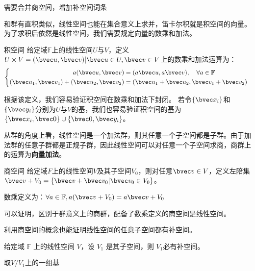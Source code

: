 

\begin{issues}
\issueDraft 
需要合并商空间，增加补空间词条
\end{issues}
和群有直积类似，线性空间也能在集合意义上求并，笛卡尔积就是积空间的向量。为了求积后依然是线性空间，我们需要规定向量的数乘和加法。

\begin{definition}{积空间}
给定域$\mathbb F $上的线性空间$U$与$V$，定义$U\times V={(\bvec u,\bvec v)|\bvec u\in U,\bvec v\in V}$上的数乘和加法运算为：
\begin{equation}
\left\{\begin{aligned}
a(\bvec u,\bvec v)&=(a\bvec u,a\bvec v),\quad \forall a\in \mathbb F\\
(\bvec u_1,\bvec v_1)+(\bvec u_2,\bvec v_2)&=(\bvec u_1+\bvec u_2,\bvec v_1+\bvec v_2)
\end{aligned}\right.~
\end{equation}
\end{definition}
根据该定义，我们容易验证积空间在数乘和加法下封闭。
若令$\{\bvec x_i\}$和$\{\bvec y_i\}$分别为$U$与$V$的基，我们也容易验证积空间的基为$\{\bvec x_i,\bvec 0\}\cup \{\bvec 0,\bvec y_i\}$。

从群的角度上看，线性空间是一个加法群，则其任意一个子空间都是子群。由于加法群的任意子群都是正规子群，因此线性空间可以对任意一个子空间求商，商群上的运算为\textbf{向量加法}。
\begin{definition}{商空间}
给定域$F$上的线性空间$V$及其子空间$V_0$，则对任意$\bvec v\in V$，定义左陪集$\bvec v+V_0=\{\bvec v+\bvec v_0|\bvec v_0\in V_0\}$。

数乘定义为：$\forall a\in \mathbb F,a(\bvec v+V_0)=a\bvec v+V_0$
\end{definition}
可以证明，区别于群意义上的商群，配备了数乘定义的商空间是线性空间。

利用商空间的概念也能证明线性空间的任意子空间都有补空间。
\begin{theorem}{}
给定域 $\mathbb F$ 上的线性空间 $V$，设 $V_1$ 是其子空间，则 $V_1$必有补空间。
\end{theorem}
取$V/V_1$上的一组基